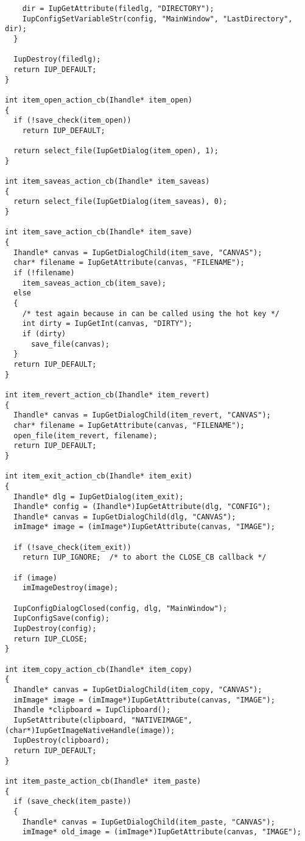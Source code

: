 \documentclass{ctexart}
\begin{document}
\begin{lstlisting}
    dir = IupGetAttribute(filedlg, "DIRECTORY");
    IupConfigSetVariableStr(config, "MainWindow", "LastDirectory", dir);
  }

  IupDestroy(filedlg);
  return IUP_DEFAULT;
}

int item_open_action_cb(Ihandle* item_open)
{
  if (!save_check(item_open))
    return IUP_DEFAULT;

  return select_file(IupGetDialog(item_open), 1);
}

int item_saveas_action_cb(Ihandle* item_saveas)
{
  return select_file(IupGetDialog(item_saveas), 0);
}

int item_save_action_cb(Ihandle* item_save)
{
  Ihandle* canvas = IupGetDialogChild(item_save, "CANVAS");
  char* filename = IupGetAttribute(canvas, "FILENAME");
  if (!filename)
    item_saveas_action_cb(item_save);
  else   
  {
    /* test again because in can be called using the hot key */
    int dirty = IupGetInt(canvas, "DIRTY");
    if (dirty)
      save_file(canvas);
  }
  return IUP_DEFAULT;
}

int item_revert_action_cb(Ihandle* item_revert)
{
  Ihandle* canvas = IupGetDialogChild(item_revert, "CANVAS");
  char* filename = IupGetAttribute(canvas, "FILENAME");
  open_file(item_revert, filename);
  return IUP_DEFAULT;
}

int item_exit_action_cb(Ihandle* item_exit)
{
  Ihandle* dlg = IupGetDialog(item_exit);
  Ihandle* config = (Ihandle*)IupGetAttribute(dlg, "CONFIG");
  Ihandle* canvas = IupGetDialogChild(dlg, "CANVAS");
  imImage* image = (imImage*)IupGetAttribute(canvas, "IMAGE");

  if (!save_check(item_exit))
    return IUP_IGNORE;  /* to abort the CLOSE_CB callback */

  if (image)
    imImageDestroy(image);

  IupConfigDialogClosed(config, dlg, "MainWindow");
  IupConfigSave(config);
  IupDestroy(config);
  return IUP_CLOSE;
}

int item_copy_action_cb(Ihandle* item_copy) 
{
  Ihandle* canvas = IupGetDialogChild(item_copy, "CANVAS");
  imImage* image = (imImage*)IupGetAttribute(canvas, "IMAGE");
  Ihandle *clipboard = IupClipboard();
  IupSetAttribute(clipboard, "NATIVEIMAGE", (char*)IupGetImageNativeHandle(image));
  IupDestroy(clipboard);
  return IUP_DEFAULT;
}

int item_paste_action_cb(Ihandle* item_paste) 
{
  if (save_check(item_paste))
  {
    Ihandle* canvas = IupGetDialogChild(item_paste, "CANVAS");
    imImage* old_image = (imImage*)IupGetAttribute(canvas, "IMAGE");


\end{lstlisting}
\end{document}
